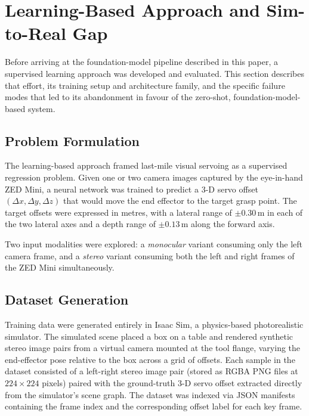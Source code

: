 \documentclass[lettersize,journal]{IEEEtran}
\begin{document}
\section{Learning-Based Approach and Sim-to-Real Gap}
\label{sec:learning}

Before arriving at the foundation-model pipeline described in this paper,
a supervised learning approach was developed and evaluated.  This section
describes that effort, its training setup and architecture family, and the
specific failure modes that led to its abandonment in favour of the
zero-shot, foundation-model-based system.

\subsection{Problem Formulation}

The learning-based approach framed last-mile visual servoing as a supervised
regression problem.  Given one or two camera images captured by the
eye-in-hand ZED Mini, a neural network was trained to predict a 3-D servo
offset $(\Delta x, \Delta y, \Delta z)$ that would move the end effector
to the target grasp point.  The target offsets were expressed in metres,
with a lateral range of $\pm 0.30$\,m in each of the two lateral axes and
a depth range of $\pm 0.13$\,m along the forward axis.

Two input modalities were explored: a \emph{monocular} variant consuming
only the left camera frame, and a \emph{stereo} variant consuming both the
left and right frames of the ZED Mini simultaneously.

\subsection{Dataset Generation}

Training data were generated entirely in Isaac Sim, a physics-based
photorealistic simulator.  The simulated scene placed a box on a table
and rendered synthetic stereo image pairs from a virtual camera mounted
at the tool flange, varying the end-effector pose relative to the box
across a grid of offsets.  Each sample in the dataset consisted of a
left-right stereo image pair (stored as RGBA PNG files at $224 \times 224$
pixels) paired with the ground-truth 3-D servo offset extracted directly
from the simulator's scene graph.  The dataset was indexed via JSON
manifests containing the frame index and the corresponding offset label
for each key frame.
\end{document}
